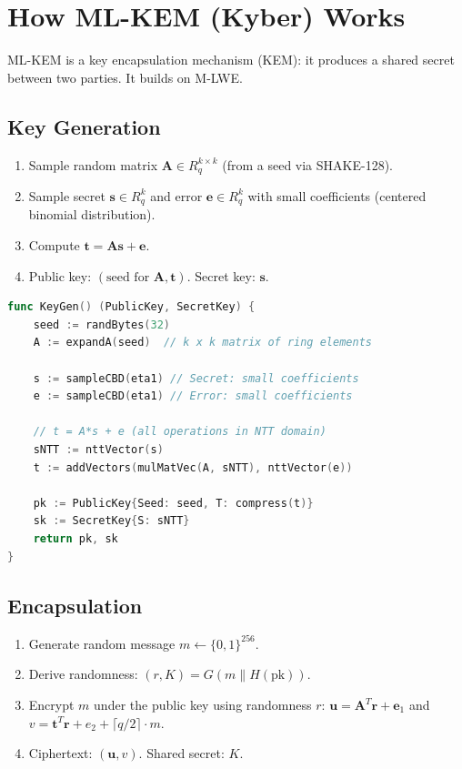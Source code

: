 \documentclass[11pt,a4paper]{article}
\begin{document}
\section{How ML-KEM (Kyber) Works}

ML-KEM is a key encapsulation mechanism (KEM): it produces a shared secret between two
parties. It builds on M-LWE.

\subsection{Key Generation}

\begin{enumerate}[nosep]
  \item Sample random matrix $\mathbf{A} \in R_q^{k \times k}$ (from a seed via SHAKE-128).
  \item Sample secret $\mathbf{s} \in R_q^k$ and error $\mathbf{e} \in R_q^k$ with small
    coefficients (centered binomial distribution).
  \item Compute $\mathbf{t} = \mathbf{A}\mathbf{s} + \mathbf{e}$.
  \item Public key: $(\text{seed for } \mathbf{A}, \mathbf{t})$. Secret key: $\mathbf{s}$.
\end{enumerate}

\begin{lstlisting}[language=Go,caption={ML-KEM key generation (simplified)}]
func KeyGen() (PublicKey, SecretKey) {
    seed := randBytes(32)
    A := expandA(seed)  // k x k matrix of ring elements

    s := sampleCBD(eta1) // Secret: small coefficients
    e := sampleCBD(eta1) // Error: small coefficients

    // t = A*s + e (all operations in NTT domain)
    sNTT := nttVector(s)
    t := addVectors(mulMatVec(A, sNTT), nttVector(e))

    pk := PublicKey{Seed: seed, T: compress(t)}
    sk := SecretKey{S: sNTT}
    return pk, sk
}
\end{lstlisting}

\subsection{Encapsulation}

\begin{enumerate}[nosep]
  \item Generate random message $m \gets \{0,1\}^{256}$.
  \item Derive randomness: $(r, K) = G(m \| H(\text{pk}))$.
  \item Encrypt $m$ under the public key using randomness $r$:
    $\mathbf{u} = \mathbf{A}^T \mathbf{r} + \mathbf{e}_1$ and
    $v = \mathbf{t}^T \mathbf{r} + e_2 + \lceil q/2 \rceil \cdot m$.
  \item Ciphertext: $(\mathbf{u}, v)$. Shared secret: $K$.
\end{enumerate}
\end{document}
